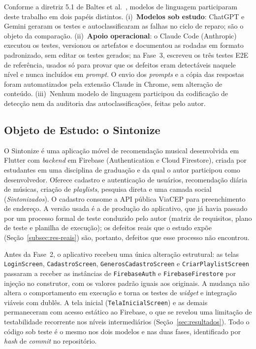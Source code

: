 \documentclass[12pt]{article}
\begin{document}
Conforme a diretriz 5.1 de Baltes et al.~\cite{baltes2026guidelines},
modelos de linguagem participaram deste trabalho em dois papéis distintos.
(i)~\textbf{Modelos sob estudo}: ChatGPT e Gemini geraram os testes e
autoclassificaram as falhas no ciclo de reparo; são o objeto da comparação.
(ii)~\textbf{Apoio operacional}: o Claude Code (Anthropic) executou os
testes, versionou os artefatos e documentou as rodadas em formato
padronizado, sem editar os testes gerados; na Fase~3, escreveu os três testes
E2E de referência, usados só para provar que os defeitos eram detectáveis
naquele nível e nunca incluídos em \textit{prompt}. O envio dos
\textit{prompts} e a cópia das respostas foram automatizados pela extensão
Claude in Chrome, sem alteração de conteúdo. (iii)~Nenhum modelo de linguagem
participou da codificação de detecção nem da auditoria das
autoclassificações, feitas pelo autor.

\subsection{Objeto de Estudo: o Sintonize}
\label{subsec:sintonize}

O Sintonize é uma aplicação móvel de recomendação musical desenvolvida em
Flutter com \textit{backend} em Firebase (Authentication e Cloud Firestore),
criada por estudantes em uma disciplina de graduação e da qual o autor
participou como desenvolvedor. Oferece cadastro e autenticação de usuários,
recomendação diária de músicas, criação de \textit{playlists}, pesquisa
direta e uma camada social (\textit{Sintonizados}). O cadastro consome a API
pública ViaCEP para preenchimento de endereço. A versão usada é a de
produção do aplicativo, que já havia passado por um processo formal de teste
conduzido pelo autor (matriz de requisitos, plano de teste e planilha de
execução); os defeitos reais que o estudo expõe (Seção~\ref{subsec:res-reais})
são, portanto, defeitos que esse processo não encontrou.

Antes da Fase~2, o aplicativo recebeu uma única alteração estrutural:
as telas \texttt{LoginScreen}, \texttt{CadastroScreen},
\texttt{GenerosCadastroScreen} e \texttt{CriarPlaylistScreen} passaram a
receber as instâncias de \texttt{FirebaseAuth} e \texttt{FirebaseFirestore}
por injeção no construtor, com os valores padrão iguais aos originais. A
mudança não altera o comportamento em execução e torna os testes de
\textit{widget} e integração viáveis com dublês. A tela inicial
(\texttt{TelaInicialScreen}) e as demais permaneceram com acesso estático
ao Firebase, o que se revelou uma limitação de testabilidade recorrente nos
níveis intermediários (Seção~\ref{sec:resultados}). Todo o código sob teste
é o mesmo nos dois modelos e nas duas fases, identificado por \textit{hash}
de \textit{commit} no repositório.
\end{document}
